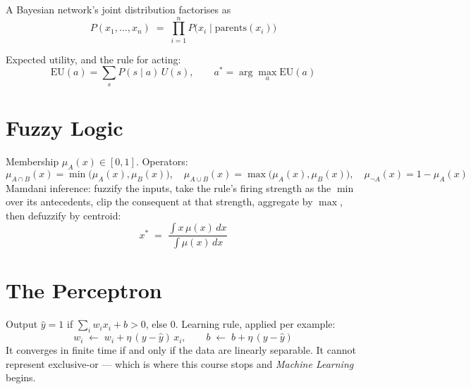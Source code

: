 A Bayesian network's joint distribution factorises as
\[
  P(x_{1},\ldots,x_{n}) \;=\; \prod_{i=1}^{n} P\bigl(x_{i} \mid
  \mathrm{parents}(x_{i})\bigr)
\]

Expected utility, and the rule for acting:
\[
  \mathrm{EU}(a) = \sum_{s} P(s \mid a)\,U(s),
  \qquad
  a^{*} = \arg\max_{a} \mathrm{EU}(a)
\]

\section{Fuzzy Logic}

Membership $\mu_{A}(x) \in [0,1]$. Operators:
\[
  \mu_{A \cap B}(x) = \min\bigl(\mu_{A}(x), \mu_{B}(x)\bigr), \quad
  \mu_{A \cup B}(x) = \max\bigl(\mu_{A}(x), \mu_{B}(x)\bigr), \quad
  \mu_{\neg A}(x) = 1 - \mu_{A}(x)
\]
Mamdani inference: fuzzify the inputs, take the rule's firing strength as the
$\min$ over its antecedents, clip the consequent at that strength, aggregate by
$\max$, then defuzzify by centroid:
\[
  x^{*} \;=\; \frac{\int x\,\mu(x)\,dx}{\int \mu(x)\,dx}
\]

\section{The Perceptron}

Output $\hat{y} = 1$ if $\sum_{i} w_{i}x_{i} + b > 0$, else $0$. Learning rule,
applied per example:
\[
  w_{i} \;\leftarrow\; w_{i} + \eta\,(y - \hat{y})\,x_{i},
  \qquad
  b \;\leftarrow\; b + \eta\,(y - \hat{y})
\]
It converges in finite time if and only if the data are linearly separable. It
cannot represent exclusive-or --- which is where this course stops and
\emph{Machine Learning} begins.
